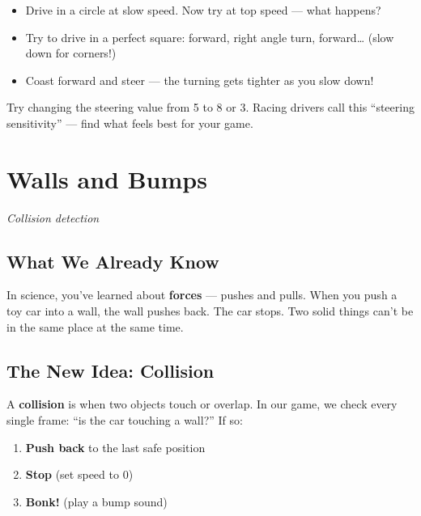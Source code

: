\documentclass[11pt,a4paper]{article}
\begin{document}
\begin{challengebox}
\begin{itemize}[nosep]
  \item Drive in a circle at slow speed. Now try at top speed --- what happens?
  \item Try to drive in a perfect square: forward, right angle turn, forward\ldots{} (slow down for corners!)
  \item Coast forward and steer --- the turning gets tighter as you slow down!
\end{itemize}
\end{challengebox}

\begin{stretchbox}
Try changing the steering value from 5 to 8 or 3. Racing drivers call this ``steering sensitivity'' --- find what feels best for your game.
\end{stretchbox}

\newpage

\section{Walls and Bumps}
\textit{\large Collision detection}

\subsection{What We Already Know}

In science, you've learned about \textbf{forces} --- pushes and pulls. When you push a toy car into a wall, the wall pushes back. The car stops. Two solid things can't be in the same place at the same time.

\subsection{The New Idea: Collision}

A \textbf{collision} is when two objects touch or overlap. In our game, we check every single frame: ``is the car touching a wall?'' If so:

\begin{enumerate}
  \item \textbf{Push back} to the last safe position
  \item \textbf{Stop} (set speed to 0)
  \item \textbf{Bonk!} (play a bump sound)
\end{enumerate}
\end{document}
